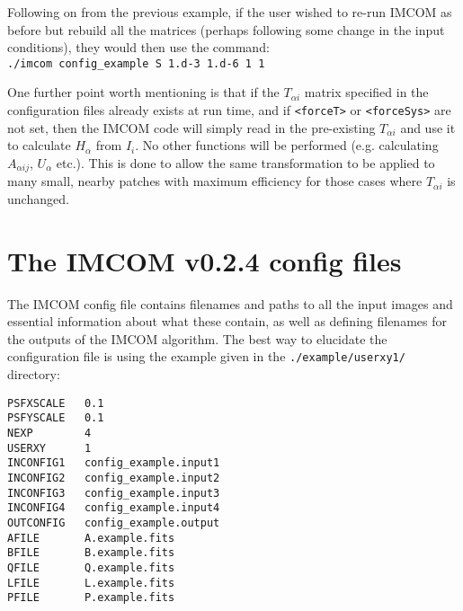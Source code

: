 \documentclass[10pt]{article}
\begin{document}
Following on from the previous example, if the user wished to re-run IMCOM as before but rebuild all the matrices (perhaps following some change in the input conditions), they would then use the command:
\\ \newline
\texttt{./imcom config\_example S 1.d-3 1.d-6 1 1}
\newline

One further point worth mentioning is that if the $T_{\alpha i}$ matrix specified in the configuration files already exists at run time, and if \texttt{<forceT>} or \texttt{<forceSys>} are not set, then the IMCOM code will simply read in the pre-existing $T_{\alpha i}$ and use it to calculate $H_{\alpha}$ from $I_i$.  No other functions will be performed (e.g. calculating $A_{\alpha i j}$, $U_{\alpha}$ etc.).  This is done to allow the same transformation to be applied to many small, nearby patches with maximum efficiency for those cases where $T_{\alpha i }$ is unchanged.

\section{The IMCOM v0.2.4 config files}\label{sect:config}
The IMCOM config file contains filenames and paths to all the input images and essential information about what these contain, as well as defining filenames for the outputs of the IMCOM algorithm. 
The best way to elucidate the configuration file is using the example given in the \texttt{./example/userxy1/} directory:

\texttt{PSFXSCALE~~~0.1 \\
PSFYSCALE~~~0.1 \\
NEXP~~~~~~~~4 \\
USERXY~~~~~~1 \\
INCONFIG1~~~config\_example.input1 \\
INCONFIG2~~~config\_example.input2 \\
INCONFIG3~~~config\_example.input3 \\
INCONFIG4~~~config\_example.input4 \\
OUTCONFIG~~~config\_example.output \\
AFILE~~~~~~~A.example.fits \\
BFILE~~~~~~~B.example.fits \\
QFILE~~~~~~~Q.example.fits \\
LFILE~~~~~~~L.example.fits \\
PFILE~~~~~~~P.example.fits   }
\end{document}
